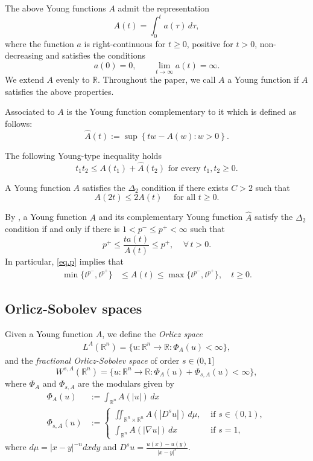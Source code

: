 \documentclass[leqno,twoside, 12pt]{amsart}
\theoremstyle{plain}
\numberwithin{equation}{section} \numberwithin{figure}{section}
\theoremstyle{definition}
\newcommand{\R}{\mathbb R}
\numberwithin{equation}{section}
\begin{document}
The above Young functions $A$ admit the representation
$$
A(t)=\int_0^t a(\tau)\,d\tau,
$$
where the function $a$ is right-continuous for $t \geq 0$, positive for $t>0$, non-decreasing and
satisfies the conditions 
$$
a(0)=0, \qquad \lim_{t\to\infty} a(t)=\infty.
$$
We extend $A$ evenly to $\R$. Throughout the paper, we call $A$ a Young function if $A$ satisfies the above properties.  

\noindent  Associated to $A$ is  the Young function  complementary to it which is defined as follows:
\begin{equation}\label{Gcomp}
\hat{A} (t) := \sup \left\lbrace tw-A(w) \colon w>0 \right\rbrace .
\end{equation}

The following Young-type inequality holds
\begin{equation}\label{2.5}
t_1t_2 \leq A(t_1)+\hat{A} (t_2) \text{  for every } t_1,t_2 \geq 0.
\end{equation}



A Young function $A$ satisfies the $\Delta_2$ condition if there exists $C>2$ such that 
$$
A(2t)\leq 2A(t) \quad \text{ for all } t\geq 0.
$$

\noindent By \cite[Theorems 4.1 and 4.3, Chapter 1]{KR},   a Young function  $A$ and its complementary Young function $\hat A$ satisfy the $\Delta_{2}$ condition if and only if there is $1<p^-\leq p^+ <\infty$ such that
\begin{equation}\label{eq.p}
p^+\leq \frac{ta(t)}{A(t)} \leq p^+, ~~~~~\forall\, t>0.
\end{equation}
In particular, \eqref{eq.p} implies that
\begin{align} \label{potencias}
\min\{t^{p^-}, t^{p^+}\}&\leq A(t) \leq \max\{t^{p^-}, t^{p^+}\}, \quad t\geq 0.
\end{align}

\subsection{Orlicz-Sobolev spaces} Given a Young function $A$, we define the \emph{Orlicz space}
\begin{align*}
L^A(\R^n) = \{ u\colon  \R^n \to \R : \Phi_A(u)<\infty\},
\end{align*}
and the \emph{fractional Orlicz-Sobolev space} of order $s\in (0,1]$ 
$$
W^{s,A}(\R^n)=\{ u \colon \R^n \to \R : \Phi_A(u)+\Phi_{s,A}(u) < \infty\},
$$
where $\Phi_A$ and $\Phi_{s,A}$ are the modulars given by
\begin{align*}
\Phi_A(u)&:=\int_{\R^n} A(|u|)\,dx \\
\Phi_{s,A}(u)&:=
\begin{cases}
\displaystyle\iint_{\R^n\times\R^n} A(|D^s u|)\,d\mu, & \text{ if } s\in(0,1),\\
\displaystyle\int_{\R^n} A(|\nabla u|)\,dx & \text{ if } s=1,
\end{cases}
\end{align*}
where $d\mu=|x-y|^{-n}dxdy$ and $D^s u=\frac{u(x)-u(y)}{|x-y|^s}$.
\end{document}
